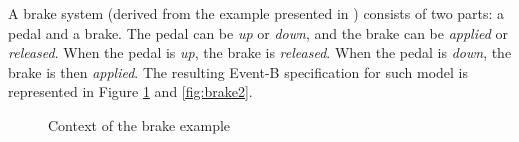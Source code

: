 \begin{example}
\normalfont
A brake system (derived from the example presented in \cite{Aouadhi2017}) consists of two parts: a pedal and a brake. The pedal can be \textit{up} or \textit{down}, and the brake can be \textit{applied} or \textit{released}. When the pedal is \textit{up}, the brake is \textit{released}. When the pedal is \textit{down}, the brake is then \textit{applied}. The resulting Event-B specification for such model is represented in Figure \ref{fig:brake1} and \ref{fig:brake2}.
\begin{figure}[H]
    \centering
    \caption{Context of the brake example}
    \label{fig:brake1}
\end{figure}
\begin{figure}[H]
    \centering

\end{figure}
\end{example}
